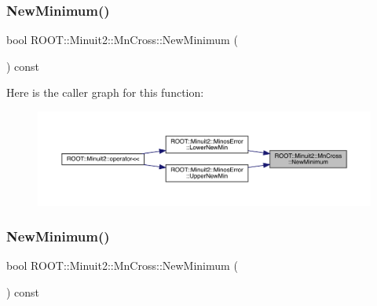 \mbox{\label{classROOT_1_1Minuit2_1_1MnCross_aaf90f3645fb5fcc67b49ffd24f4a12ba}} 
\subsubsection{\texorpdfstring{NewMinimum()}{NewMinimum()}\hspace{0.1cm}{\footnotesize\ttfamily [1/2]}}
{\footnotesize\ttfamily bool R\+O\+O\+T\+::\+Minuit2\+::\+Mn\+Cross\+::\+New\+Minimum (\begin{DoxyParamCaption}{ }\end{DoxyParamCaption}) const\hspace{0.3cm}{\ttfamily [inline]}}

Here is the caller graph for this function\+:\nopagebreak
\begin{figure}[H]
\begin{center}
\leavevmode
\includegraphics[width=350pt]{d3/db2/classROOT_1_1Minuit2_1_1MnCross_aaf90f3645fb5fcc67b49ffd24f4a12ba_icgraph}
\end{center}
\end{figure}
\mbox{\label{classROOT_1_1Minuit2_1_1MnCross_aaf90f3645fb5fcc67b49ffd24f4a12ba}} 
\subsubsection{\texorpdfstring{NewMinimum()}{NewMinimum()}\hspace{0.1cm}{\footnotesize\ttfamily [2/2]}}
{\footnotesize\ttfamily bool R\+O\+O\+T\+::\+Minuit2\+::\+Mn\+Cross\+::\+New\+Minimum (\begin{DoxyParamCaption}{ }\end{DoxyParamCaption}) const\hspace{0.3cm}{\ttfamily [inline]}}

